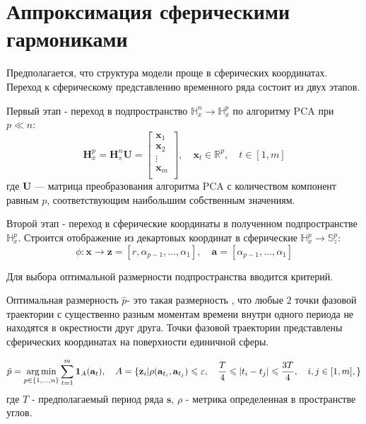 \documentclass[12pt,twoside]{article}
\begin{document}
\section{Аппроксимация сферическими гармониками}

Предполагается, что структура модели проще в сферических координатах.
Переход к сферическому представлению временного ряда состоит из двух этапов.

Первый этап - переход в подпространство $\mathbb{H}_{x}^{n} \xrightarrow{} \mathbb{H}_{x}^{p}$ по алгоритму PCA при $p \ll n $:
\[
\mathbf{H}_{x}^{p} = \mathbf{H}_{s}^{n}\mathbf{U} =
\begin{bmatrix} 
  	\mathbf{x}_{1}\\
  	\mathbf{x}_{2}\\
  	\vdots\\
  	\mathbf{x}_{m}\\
\end{bmatrix},
\quad
\mathbf{x}_{t} \in \mathbb{R}^{p},
\quad
t \in [1,m]
\]
где $\mathbf{U}$ --- матрица преобразования алгоритма PCA с количеством компонент равным $p$, соответствующим наибольшим собственным значениям.

Второй этап - переход в сферические координаты в полученном подпространстве $\mathbb{H}_{x}^{p}$.
Строится отображение из декартовых координат в сферические $\mathbb{H}_{x}^{p} \xrightarrow{} \mathbb{S}_{z}^{p}$:
\[
    \phi: \mathbf{x} \xrightarrow{} \mathbf{z} = [r,\alpha_{p-1},\dots,\alpha_1],
    \quad
    \mathbf{a} = [\alpha_{p-1},\dots,\alpha_1]
\]

Для выбора оптимальной размерности подпространства вводится критерий.
\begin{Def}
Оптимальная размерность $\hat{p}$- это такая размерность , что любые 2 точки фазовой траектории с существенно разным моментам времени внутри одного периода не находятся в окрестности друг друга.
Точки фазовой траектории представлены сферических координатах на поверхности единичной сферы.
\end{Def}

\begin{equation}           
    \hat{p} = \argmin_{p \in \{1, \dots, n \}}
    \sum_{t=1}^m \mathbf{1}_A(\mathbf{a}_t),
    \quad
    A = \{\mathbf{z}_i|
        \rho(\mathbf{a}_{t_i},\mathbf{a}_{t_j}) \leq \epsilon,
        \quad
        \frac{T}{4} \leq |t_i - t_j| \leq \frac{3T}{4},
        \quad
        i,j \in [1,m],
        \}
\label{eq:intersection_criterion} 
\end{equation}
где $T$ - предполагаемый период ряда $\mathbf{s}$, $\rho$ - метрика определенная в пространстве углов.
\end{document}
